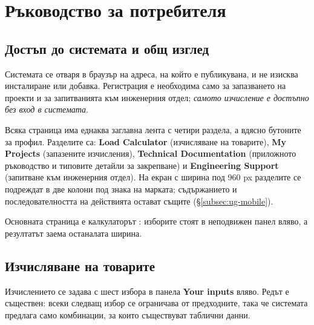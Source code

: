 %
\section{Ръководство за потребителя}
\label{sec:userguide}

\subsection{Достъп до системата и общ изглед}
\label{subsec:ug-access}

Системата се отваря в браузър на адреса, на който е публикувана, и не изисква
инсталиране или добавка. Регистрация е необходима само за запазването на проекти и за
запитванията към инженерния отдел; \emph{самото изчисление е достъпно без вход в
системата}.

Всяка страница има еднаква заглавна лента с четири раздела, а вдясно бутоните за
профил. Разделите са: \textbf{Load Calculator} (изчисляване на товарите),
\textbf{My Projects} (запазените изчисления), \textbf{Technical Documentation}
(приложното ръководство и типовите детайли за закрепване) и \textbf{Engineering
Support} (запитване към инженерния отдел). На екран с ширина под 960 px разделите се
подреждат в две колони под знака на марката; съдържанието и последователността на
действията остават същите (§\ref{subsec:ug-mobile}).

Основната страница е калкулаторът : изборите стоят в
неподвижен панел вляво, а резултатът заема останалата ширина.


\subsection{Изчисляване на товарите}
\label{subsec:ug-calc}

Изчислението се задава с шест избора в панела \textbf{Your inputs} вляво. Редът е
съществен: всеки следващ избор се ограничава от предходните, така че системата
предлага само комбинации, за които съществуват таблични данни.

